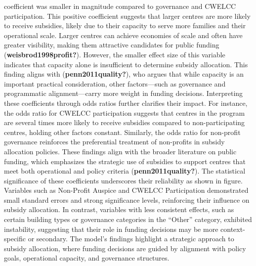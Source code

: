 \documentclass[
  letterpaper,
  DIV=11,
  numbers=noendperiod]{scrartcl}
\begin{document}
coefficient was smaller in magnitude compared to governance and CWELCC
participation. This positive coefficient suggests that larger centres
are more likely to receive subsidies, likely due to their capacity to
serve more families and their operational scale. Larger centres can
achieve economies of scale and often have greater visibility, making
them attractive candidates for public funding
(\textbf{weisbrod1998profit?}). However, the smaller effect size of this
variable indicates that capacity alone is insufficient to determine
subsidy allocation. This finding aligns with
(\textbf{penn2011quality?}), who argues that while capacity is an
important practical consideration, other factors---such as governance
and programmatic alignment---carry more weight in funding decisions.
Interpreting these coefficients through odds ratios further clarifies
their impact. For instance, the odds ratio for CWELCC participation
suggests that centres in the program are several times more likely to
receive subsidies compared to non-participating centres, holding other
factors constant. Similarly, the odds ratio for non-profit governance
reinforces the preferential treatment of non-profits in subsidy
allocation policies. These findings align with the broader literature on
public funding, which emphasizes the strategic use of subsidies to
support centres that meet both operational and policy criteria
(\textbf{penn2011quality?}). The statistical significance of these
coefficients underscores their reliability as shown in figure. Variables
such as Non-Profit Auspice and CWELCC Participation demonstrated small
standard errors and strong significance levels, reinforcing their
influence on subsidy allocation. In contrast, variables with less
consistent effects, such as certain building types or governance
categories in the ``Other'' category, exhibited instability, suggesting
that their role in funding decisions may be more context-specific or
secondary. The model's findings highlight a strategic approach to
subsidy allocation, where funding decisions are guided by alignment with
policy goals, operational capacity, and governance structures.
\end{document}
